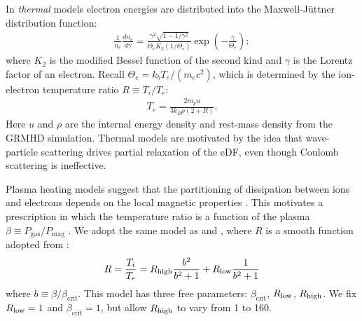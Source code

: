 In \emph{thermal} models electron energies are distributed into the Maxwell-J{\"u}ttner distribution function:
\begin{align}
  \frac{1}{n_e}\frac{dn_e}{d\gamma} = \frac{\gamma^2 \sqrt{1-1/\gamma^2}} {\Theta_e K_2(1/\Theta_e)} \exp\left(-\frac{\gamma}{\Theta_e}\right);
  \label{eq:thermaleDF}
\end{align}
where $K_2$ is the modified Bessel function of the second kind and $\gamma$ is the Lorentz factor of an electron. Recall $\Theta_e = k_b T_e/(m_e c^2)$, which is determined by the ion-electron temperature ratio $R \equiv T_i/T_e$:
\begin{align}
  T_e=\frac{2 m_p u}{3 k_B \rho (2+R)}.
\end{align}
Here $u$ and $\rho$ are the internal energy density and rest-mass density from the GRMHD simulation.
Thermal models are motivated by the idea that wave-particle scattering drives partial relaxation of the eDF, even though Coulomb scattering is ineffective.

Plasma heating models suggest that the partitioning of dissipation between ions and electrons depends on the local magnetic properties \citep[e.g.,][]{1999ApJ...520..248Q, 2010MNRAS.409L.104H, Kawazura771}.  This motivates a prescription in which the temperature ratio is a function of the plasma $\beta \equiv P_\mathrm{gas}/P_\mathrm{mag}$ \citep{2015ApJ...799....1C}.
We adopt the same model as  and , where $R$ is a smooth function adopted from \cite{2016A&A...586A..38M}:
\begin{equation}
  R = \frac{T_i}{T_e} = \Rh \frac{b^2}{b^2+1} + \Rl \frac{1}{b^2+1}
  \label{eq:rhigh_prescription}
\end{equation}
where $b \equiv \beta/\beta_\mathrm{crit}$.
This model has three free parameters: $\beta_\mathrm{crit}$, $R_\mathrm{low}$, $R_\mathrm{high}$.  We fix $R_\mathrm{low} = 1$ and $\beta_\mathrm{crit} = 1$, but allow $R_\mathrm{high}$ to vary from 1 to 160. %

